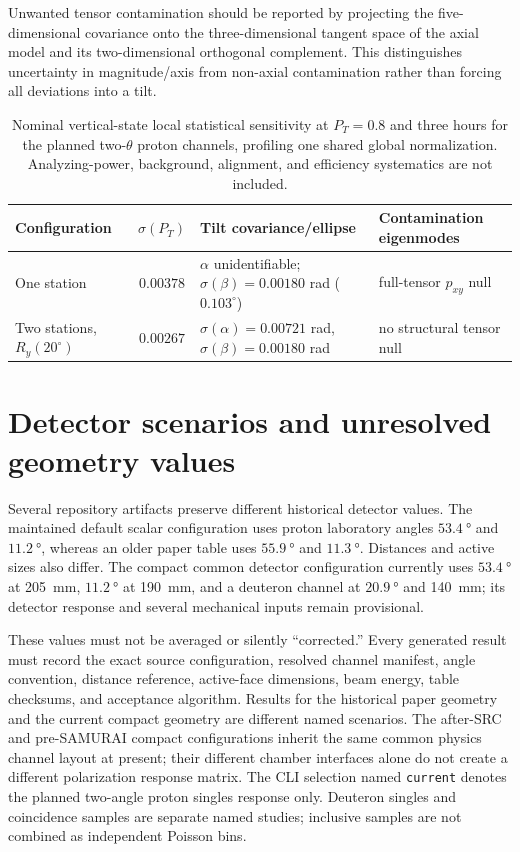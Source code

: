 \documentclass[11pt,a4paper]{article}
\begin{document}
Unwanted tensor contamination should be reported by projecting the
five-dimensional covariance onto the three-dimensional tangent space of the
axial model and its two-dimensional orthogonal complement.  This distinguishes
uncertainty in magnitude/axis from non-axial contamination rather than forcing
all deviations into a tilt.

\begin{table}[htbp]
\centering
\caption{Nominal vertical-state local statistical sensitivity at $P_T=0.8$ and
three hours for the planned two-$\theta$ proton channels, profiling one shared
global normalization.  Analyzing-power, background, alignment, and efficiency
systematics are not included.}
\small
\begin{tabularx}{\linewidth}{YcYY}
\toprule
Configuration & $\sigma(P_T)$ & Tilt covariance/ellipse & Contamination eigenmodes\\
\midrule
One station & $0.00378$ & $\alpha$ unidentifiable; $\sigma(\beta)=0.00180$ rad ($0.103^\circ$) & full-tensor $p_{xy}$ null\\
Two stations, $R_y(20^\circ)$ & $0.00267$ & $\sigma(\alpha)=0.00721$ rad, $\sigma(\beta)=0.00180$ rad & no structural tensor null\\
\bottomrule
\end{tabularx}
\label{tab:nominal-pyy}
\end{table}

\section{Detector scenarios and unresolved geometry values}

Several repository artifacts preserve different historical detector values.
The maintained default scalar configuration uses proton laboratory angles
$\SI{53.4}{\degree}$ and $\SI{11.2}{\degree}$, whereas an older paper table
uses $\SI{55.9}{\degree}$ and $\SI{11.3}{\degree}$.  Distances and active sizes
also differ.  The compact common detector configuration currently uses
$\SI{53.4}{\degree}$ at \SI{205}{mm}, $\SI{11.2}{\degree}$ at \SI{190}{mm},
and a deuteron channel at $\SI{20.9}{\degree}$ and \SI{140}{mm}; its detector
response and several mechanical inputs remain provisional.

These values must not be averaged or silently ``corrected.''  Every generated
result must record the exact source configuration, resolved channel manifest,
angle convention, distance reference, active-face dimensions, beam energy,
table checksums, and acceptance algorithm.  Results for the historical paper
geometry and the current compact geometry are different named scenarios.
The after-SRC and pre-SAMURAI compact configurations inherit the same common
physics channel layout at present; their different chamber interfaces alone do
not create a different polarization response matrix.
The CLI selection named \texttt{current} denotes the planned two-angle proton
singles response only.  Deuteron singles and coincidence samples are separate
named studies; inclusive samples are not combined as independent Poisson bins.
\end{document}
